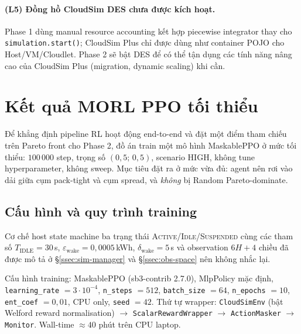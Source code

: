 \paragraph{(L5) Đồng hồ CloudSim DES chưa được kích hoạt.}
Phase 1 dùng manual resource accounting kết hợp piecewise integrator
thay cho \texttt{simulation.start()}; CloudSim Plus chỉ được dùng
như container POJO cho Host/VM/Cloudlet. Phase 2 sẽ bật DES để có
thể tận dụng các tính năng nâng cao của CloudSim Plus (migration,
dynamic scaling) khi cần.

\section{Kết quả MORL PPO tối thiểu}
\label{sec:res-phase18}

Để khẳng định pipeline RL hoạt động end-to-end và đặt một điểm tham
chiếu trên Pareto front cho Phase 2, đồ án train một mô hình
MaskablePPO ở mức tối thiểu: $100\,000$ step, trọng số
$(0{,}5;\, 0{,}5)$, scenario HIGH, không tune hyperparameter, không
sweep. Mục tiêu đặt ra ở mức vừa đủ: agent nên rơi vào dải giữa cụm
pack-tight và cụm spread, và \emph{không} bị Random Pareto-dominate.

\subsection{Cấu hình và quy trình training}
\label{ssec:res-ppo-config}

Cơ chế host state machine ba trạng thái
\textsc{Active}/\textsc{Idle}/\textsc{Suspended} cùng các tham số
$T_{\mathrm{IDLE}} = 30$\,s, $\varepsilon_{\mathrm{wake}} =
0{,}0005$\,kWh, $\delta_{\mathrm{wake}} = 5$\,s và observation $6H +
4$ chiều đã được mô tả ở §\ref{ssec:sim-manager} và §\ref{ssec:obs-space}
nên không nhắc lại.

Cấu hình training: MaskablePPO (sb3-contrib 2.7.0), MlpPolicy mặc
định, \texttt{learning\_rate} $= 3\cdot 10^{-4}$,
\texttt{n\_steps} $= 512$, \texttt{batch\_size} $= 64$,
\texttt{n\_epochs} $= 10$, \texttt{ent\_coef} $= 0{,}01$, CPU only,
\texttt{seed} $= 42$. Thứ tự wrapper: \texttt{CloudSimEnv} (bật
Welford reward normalisation) $\to$ \texttt{ScalarRewardWrapper}
$\to$ \texttt{ActionMasker} $\to$ \texttt{Monitor}. Wall-time
$\approx 40$ phút trên CPU laptop.



